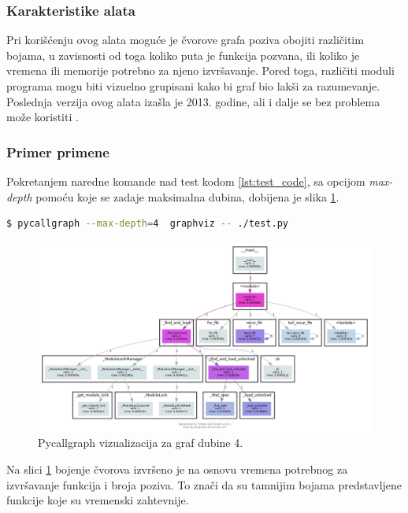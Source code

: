 \documentclass[a4paper]{article}
\begin{document}
\subsubsection{Karakteristike alata}
Pri korišćenju ovog alata moguće je čvorove grafa poziva obojiti različitim bojama, u zavisnosti od toga koliko puta je funkcija pozvana, ili koliko je vremena ili memorije potrebno za njeno izvršavanje. Pored toga, različiti moduli programa mogu biti vizuelno grupisani kako bi graf bio lakši za razumevanje. Poslednja verzija ovog alata izašla je 2013. godine, ali i dalje se bez problema može koristiti \cite{Pycallgraph}.

\subsubsection{Primer primene}
Pokretanjem naredne komande nad test kodom \ref{lst:test_code}, sa opcijom {\em max-depth} pomoću koje se zadaje maksimalna dubina, dobijena je slika \ref{fig:pycallgraph4_1}.
\begin{lstlisting}[language=bash,frame=single, belowskip=-\baselineskip, label=lst:pycallgraph4_1]
  $ pycallgraph --max-depth=4  graphviz -- ./test.py
\end{lstlisting}
\begin{figure}[h!]
\begin{center}
\includegraphics[scale=0.26]{MVJ_02_ProfajleriZaPython_ZecevicSmiljanicMilovanovicPopov/pycallgraph_depth4.png}
 \end{center}
 \caption{Pycallgraph vizualizacija za graf dubine 4.}
 \label{fig:pycallgraph4_1}
 \end{figure}
 Na slici \ref{fig:pycallgraph4_1} bojenje čvorova izvršeno je na osnovu vremena potrebnog za izvršavanje funkcija i broja poziva. To znači da su tamnijim bojama predstavljene funkcije koje su vremenski zahtevnije.
    
\end{document}
